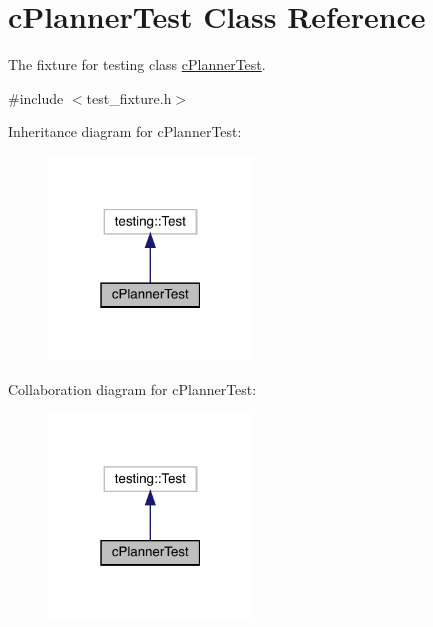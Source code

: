 \hypertarget{classc_planner_test}{}\section{c\+Planner\+Test Class Reference}
\label{classc_planner_test}


The fixture for testing class \mbox{\hyperlink{classc_planner_test}{c\+Planner\+Test}}.  




{\ttfamily \#include $<$test\+\_\+fixture.\+h$>$}



Inheritance diagram for c\+Planner\+Test\+:
\nopagebreak
\begin{figure}[H]
\begin{center}
\leavevmode
\includegraphics[width=154pt]{classc_planner_test__inherit__graph}
\end{center}
\end{figure}


Collaboration diagram for c\+Planner\+Test\+:
\nopagebreak
\begin{figure}[H]
\begin{center}
\leavevmode
\includegraphics[width=154pt]{classc_planner_test__coll__graph}
\end{center}
\end{figure}

